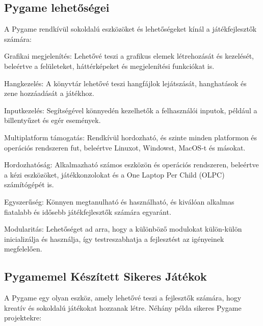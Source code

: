 \subsection{Pygame lehetőségei}
A Pygame rendkívül sokoldalú eszközöket és lehetőségeket kínál a játékfejlesztők számára:

Grafikai megjelenítés: Lehetővé teszi a grafikus elemek létrehozását és kezelését, beleértve a felületeket, háttérképeket és megjelenítési funkciókat is.

Hangkezelés: A könyvtár lehetővé teszi hangfájlok lejátszását, hanghatások és zene hozzáadását a játékhoz.

Inputkezelés: Segítségével könnyedén kezelhetők a felhasználói inputok, például a billentyűzet és egér események.

Multiplatform támogatás: Rendkívül hordozható, és szinte minden platformon és operációs rendszeren fut, beleértve Linuxot, Windowst, MacOS-t és másokat.

Hordozhatóság: Alkalmazható számos eszközön és operációs rendszeren, beleértve a kézi eszközöket, játékkonzolokat és a One Laptop Per Child (OLPC) számítógépét is.

Egyszerűség: Könnyen megtanulható és használható, és kiválóan alkalmas fiatalabb és idősebb játékfejlesztők számára egyaránt.

Modularitás: Lehetőséget ad arra, hogy a különböző modulokat külön-külön inicializálja és használja, így testreszabhatja a fejlesztést az igényeinek megfelelően.



\subsection{Pygamemel Készített Sikeres Játékok}
A Pygame egy olyan eszköz, amely lehetővé teszi a fejlesztők számára, hogy kreatív és sokoldalú játékokat hozzanak létre. Néhány példa sikeres Pygame projektekre:

